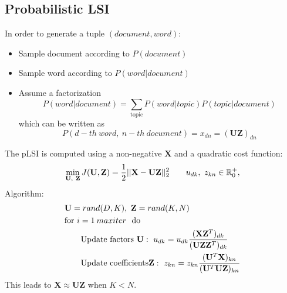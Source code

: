 \documentclass[a4paper,11pt,landscape]{article}
\newcommand{\R}{\mathbb{R}}
\begin{document}
\begin{multicols}{3}
\subsection{Probabilistic LSI}
In order to generate a tuple $({document}, {word})$:
\begin{itemize}
 \item Sample document according to $P(document)$
 \item Sample word according to $P(word|document)$
 \item Assume a factorization
  \[
   P(word|document) = \sum_{\text{topic}} P(word|topic)P(topic|document)
  \]
  which can be written as
  \[
   P(d-th\ word,\ n-th\ document) = x_{dn} = (\mathbf{UZ})_{dn}
  \]
\end{itemize}
The pLSI is computed using a non-negative $\mathbf X$ and a quadratic cost function:
\begin{align*}
 \min_{\mathbf U,\ \mathbf Z} J(\mathbf U, \mathbf Z) = {1\over 2} || \mathbf X- \mathbf U \mathbf Z||_2^2\qquad u_{dk},\ z_{kn} \in \R_0^+,
\end{align*}
Algorithm:
\begin{align*}
 &\mathbf U = rand(D,K),\ \mathbf Z = rand(K,N)\\
 &\text{for }i=1\:maxiter\ \text{ do}\\
 &\qquad \text{Update factors } \mathbf U: \ u_{dk} = u_{dk}{ (\mathbf X \mathbf Z^T)_{dk} \over (\mathbf U \mathbf Z \mathbf Z^T)_{dk}}\\
 &\qquad \text{Update coefficients} \mathbf Z:\ z_{kn} = z_{kn} {(\mathbf U^T \mathbf X)_{kn} \over (\mathbf U^T\mathbf U \mathbf Z)_{kn}}
\end{align*}
This leads to $\mathbf X \approx \mathbf{UZ}$ when $K<N$.


\end{multicols}
\end{document}
